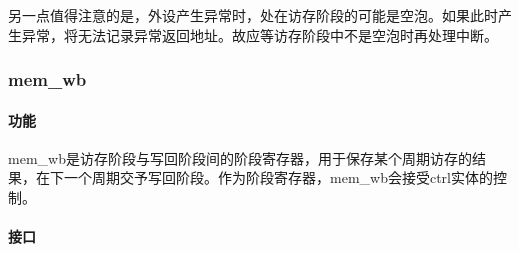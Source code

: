 \documentclass{article}
\begin{document}
\begin{spacing}{1.4}
另一点值得注意的是，外设产生异常时，处在访存阶段的可能是空泡。如果此时产生异常，将无法记录异常返回地址。故应等访存阶段中不是空泡时再处理中断。

\subsubsection{mem\_wb}

\paragraph{功能}\mbox{}

mem\_wb是访存阶段与写回阶段间的阶段寄存器，用于保存某个周期访存的结果，在下一个周期交予写回阶段。作为阶段寄存器，mem\_wb会接受ctrl实体的控制。

\paragraph{接口}\mbox{}


\end{spacing}
\end{document}
